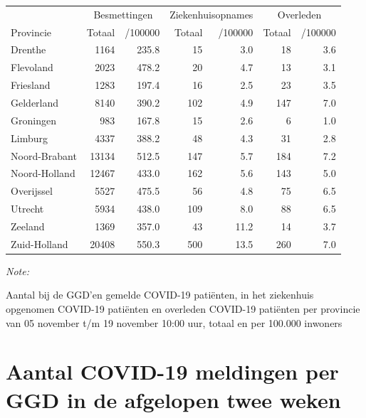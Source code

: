 \documentclass[
  english,
  man,floatsintext]{apa6}
\begin{document}
\begin{table}[H]
\centering
\begin{threeparttable}
\begin{tabular}{lrrrrrr}
\toprule
\multicolumn{1}{c}{ } & \multicolumn{2}{c}{Besmettingen} & \multicolumn{2}{c}{Ziekenhuisopnames} & \multicolumn{2}{c}{Overleden} \\
\cmidrule(l{3pt}r{3pt}){2-3} \cmidrule(l{3pt}r{3pt}){4-5} \cmidrule(l{3pt}r{3pt}){6-7}
Provincie & Totaal & /100000 & Totaal & /100000 & Totaal & /100000\\
\midrule
Drenthe & 1164 & 235.8 & 15 & 3.0 & 18 & 3.6\\
Flevoland & 2023 & 478.2 & 20 & 4.7 & 13 & 3.1\\
Friesland & 1283 & 197.4 & 16 & 2.5 & 23 & 3.5\\
Gelderland & 8140 & 390.2 & 102 & 4.9 & 147 & 7.0\\
Groningen & 983 & 167.8 & 15 & 2.6 & 6 & 1.0\\
Limburg & 4337 & 388.2 & 48 & 4.3 & 31 & 2.8\\
Noord-Brabant & 13134 & 512.5 & 147 & 5.7 & 184 & 7.2\\
Noord-Holland & 12467 & 433.0 & 162 & 5.6 & 143 & 5.0\\
Overijssel & 5527 & 475.5 & 56 & 4.8 & 75 & 6.5\\
Utrecht & 5934 & 438.0 & 109 & 8.0 & 88 & 6.5\\
Zeeland & 1369 & 357.0 & 43 & 11.2 & 14 & 3.7\\
Zuid-Holland & 20408 & 550.3 & 500 & 13.5 & 260 & 7.0\\
\bottomrule
\end{tabular}
\begin{tablenotes}
\item \textit{Note: } 
\item Aantal bij de GGD’en gemelde COVID-19 patiënten, in het ziekenhuis opgenomen COVID-19 patiënten en overleden COVID-19 patiënten per provincie van 05 november t/m 19 november 10:00 uur, totaal en per 100.000 inwoners
\end{tablenotes}
\end{threeparttable}
\end{table}

\newpage

\hypertarget{aantal-covid-19-meldingen-per-ggd-in-de-afgelopen-twee-weken}{%
\section{Aantal COVID-19 meldingen per GGD in de afgelopen twee weken}\label{aantal-covid-19-meldingen-per-ggd-in-de-afgelopen-twee-weken}}
\end{document}
